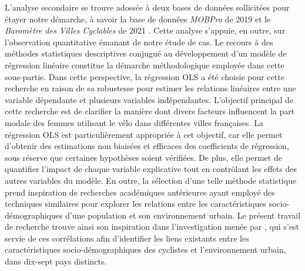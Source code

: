 \begin{refsegment}
L'analyse secondaire se trouve adossée à deux bases de données sollicitées pour étayer notre démarche, à savoir la base de données \textsl{MOBPro} de 2019 \textcolor{blue}{\autocite{insee_documentation_2023}} et le \textsl{Baromètre des Villes Cyclables} de 2021 \textcolor{blue}{\autocite{fub_barometre_2021}}. Cette analyse s'appuie, en outre, sur l'observation quantitative émanant de notre étude de cas. Le recours à des méthodes statistiques descriptives conjugué au développement d'un modèle de régression linéaire constitue la démarche méthodologique employée dans cette sous-partie. Dans cette perspective, la régression \acrshort{OLS} a été choisie pour cette recherche en raison de sa robustesse pour estimer les relations linéaires entre une variable dépendante et plusieurs variables indépendantes. L'objectif principal de cette recherche est de clarifier la manière dont divers facteurs influencent la part modale des femmes utilisant le vélo dans différentes villes françaises. La régression \acrshort{OLS} est particulièrement appropriée à cet objectif, car elle permet d'obtenir des estimations non biaisées et efficaces des coefficients de régression, sous réserve que certaines hypothèses soient vérifiées. De plus, elle permet de quantifier l'impact de chaque variable explicative tout en contrôlant les effets des autres variables du modèle. En outre, la sélection d'une telle méthode statistique prend inspiration de recherches académiques antérieures ayant employé des techniques similaires pour explorer les relations entre les caractéristiques socio-démographiques d'une population et son environnement urbain. Le présent travail de recherche trouve ainsi son inspiration dans l'investigation menée par \textcolor{blue}{\textcite[64]{goel_cycling_2022}}, qui s'est servie de ces corrélations afin d'identifier les liens existants entre les caractéristiques socio-démographiques des cyclistes et l'environnement urbain, dans dix-sept pays distincts.%


\end{refsegment}
